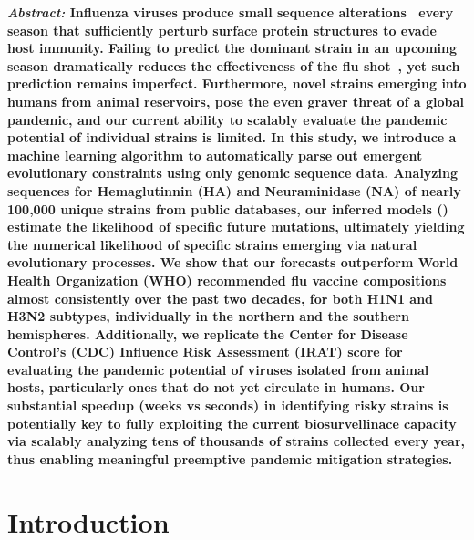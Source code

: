 \documentclass[onecolumn, compsoc,10pt]{IEEEtran}
\begin{document}
  
 
\maketitle
 
  {\bf \sffamily \fontsize{10}{12}\selectfont \noindent   
{\normalfont \itshape Abstract:} Influenza viruses produce  small sequence alterations~\cite{dos2016influenza} every season  that sufficiently perturb surface protein structures to evade host immunity. Failing to predict the dominant strain in an upcoming season  dramatically reduces  the  effectiveness of the flu shot~\cite{tricco2013comparing}, yet such prediction remains imperfect. Furthermore, novel strains emerging into humans from animal reservoirs,  pose the even graver threat of a global  pandemic, and our current ability to  scalably  evaluate the pandemic potential of   individual strains  is limited. In this study, we introduce a machine learning algorithm to automatically parse out emergent evolutionary constraints using only genomic sequence data. Analyzing sequences for   Hemaglutinnin (HA) and Neuraminidase (NA)  of nearly 100,000 unique \infl  strains from public  databases, our inferred models ()  estimate the likelihood of specific future  mutations, ultimately  yielding the  numerical likelihood of specific  strains emerging via natural evolutionary processes. We show that our forecasts  outperform World Health Organization (WHO) recommended flu vaccine compositions almost consistently over the past two decades, for both H1N1 and H3N2 subtypes, individually in the northern and the southern hemispheres. Additionally, we replicate the  Center for Disease Control's (CDC) Influence Risk Assessment (IRAT) score for evaluating  the pandemic potential of  \infl  viruses isolated from animal hosts, particularly ones  that do not yet circulate in humans. Our  substantial speedup (weeks vs seconds) in  identifying risky strains is potentially key to fully exploiting the  current biosurvellinace capacity via scalably analyzing tens of thousands of strains collected every year, thus  enabling  meaningful preemptive pandemic mitigation strategies. 
}

\vspace{10pt}
\section*{Introduction}
\end{document}
